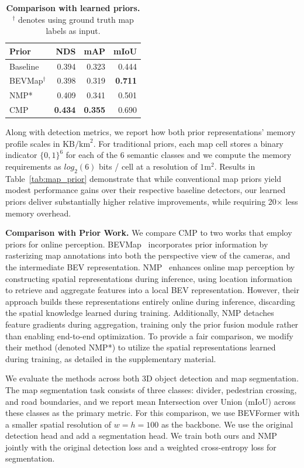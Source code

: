 \documentclass{article} %
\newcommand{\myparagraph}[1]{\vspace{0.2em}\noindent\textbf{#1}}
\newcommand{\tablestyle}[2]{\setlength{\tabcolsep}{#1}\renewcommand{\arraystretch}{#2}\centering\small}
\newcommand{\ours}{CMP\xspace}
\begin{document}
\begin{table}[b]
	\centering
	\tablestyle{3pt}{1.05}
	\begin{tabular}{ lrrr }
		\toprule
		Prior & NDS & mAP & mIoU \\
		\midrule
		Baseline & 0.394 & 0.323 & 0.444 \\
		BEVMap$^\dagger$ & 0.398 & 0.319 & \textbf{0.711} \\
		NMP* & 0.409 & 0.341 & 0.501 \\
		\ours & \textbf{0.434} & \textbf{0.355} & 0.690 \\
		\bottomrule
	\end{tabular}
	\caption{\textbf{Comparison with learned priors.} $^\dagger$ denotes using ground truth map labels as input.}
	\label{tab:compareprior}
\end{table}

Along with detection metrics, we report how both prior representations' memory profile scales in $\text{KB} / \text{km}^2$.
For traditional priors, each map cell stores a binary indicator $\{0, 1\}^6$ for each of the 6 semantic classes and we compute the memory requirements as $log_2(6)$ bits / cell at a resolution of $1 \text{m}^2$.
Results in Table~\ref{tab:map_prior} demonstrate that while conventional map priors yield modest performance gains over their respective baseline detectors, our learned priors deliver substantially higher relative improvements, while requiring 20× less memory overhead.


\myparagraph{Comparison with Prior Work.}
We compare \ours to two works that employ priors for online perception.
BEVMap~\cite{chang2024bevmap} incorporates prior information by rasterizing map annotations into both the perspective view of the cameras, and the intermediate BEV representation.
NMP~\cite{xiong2023neural} enhances online map perception by constructing spatial representations during inference, using location information to retrieve and aggregate features into a local BEV representation.
However, their approach builds these representations entirely online during inference, discarding the spatial knowledge learned during training.
Additionally, NMP detaches feature gradients during aggregation, training only the prior fusion module rather than enabling end-to-end optimization.
To provide a fair comparison, we modify their method (denoted NMP*) to utilize the spatial representations learned during training, as detailed in the supplementary material.

We evaluate the methods across both 3D object detection and map segmentation.
The map segmentation task consists of three classes: divider, pedestrian crossing, and road boundaries, and we report mean Intersection over Union (mIoU) across these classes as the primary metric.
For this comparison, we use BEVFormer with a smaller spatial resolution of $w=h=100$ as the backbone.
We use the original detection head and add a segmentation head.
We train both ours and NMP jointly with the original detection loss and a weighted cross-entropy loss for segmentation.
\end{document}
